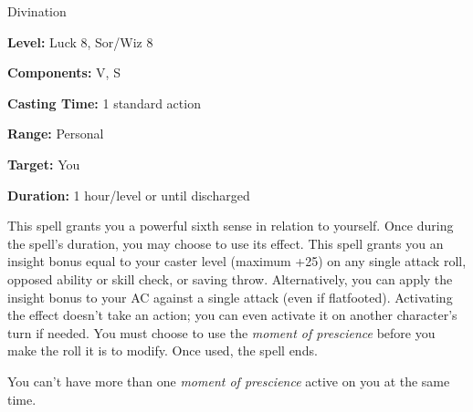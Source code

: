 
Divination

\textbf{Level:} Luck 8, Sor/Wiz 8

\textbf{Components:} V, S

\textbf{Casting Time:} 1 standard action

\textbf{Range:} Personal

\textbf{Target:} You

\textbf{Duration:} 1 hour/level or until discharged

This spell grants you a powerful sixth sense in relation to yourself. Once during 
the spell's duration, you may choose to use its effect. This spell grants you an 
insight bonus equal to your caster level (maximum +25) on any single attack roll, 
opposed ability or skill check, or saving throw. Alternatively, you can apply the 
insight bonus to your AC against a single attack (even if flatfooted). Activating 
the effect doesn't take an action; you can even activate it on another character's 
turn if needed. You must choose to use the \textit{moment of prescience} before 
you make the roll it is to modify. Once used, the spell ends.

You can't have more than one \textit{moment of prescience} active on you at the 
same time.

